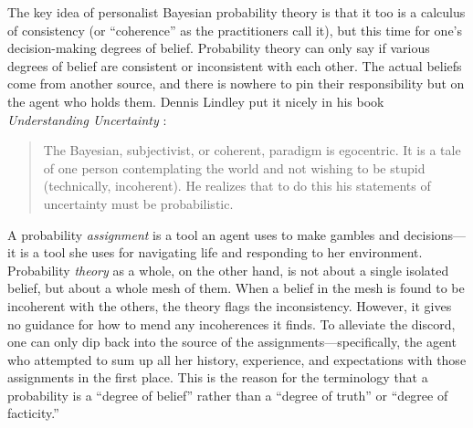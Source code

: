 \documentclass[aps,pra,superscriptaddress,12pt,tightenlines,nofootinbib]{revtex4-2}
\begin{document}
The key idea of personalist Bayesian probability theory is that it too is a calculus of consistency (or ``coherence'' as the practitioners call it), but this time for one's decision-making degrees of belief.  Probability theory can only say if various degrees of belief are consistent or inconsistent with each other. The actual beliefs come from another source, and there is nowhere to pin their responsibility but on the agent who holds them.  Dennis Lindley put it nicely in his book {\sl Understanding Uncertainty\/} \cite{Lindley06}:
\begin{quote}
The Bayesian, subjectivist, or coherent, para\-digm is egocentric. It is a tale of one person contemplating the world and not wishing to be stupid (technically, incoherent). He realizes that to do this his statements of uncertainty must be probabilistic.
\end{quote}
A probability {\it assignment\/} is a tool an agent uses to make gambles and decisions---it is a tool she uses for navigating life and responding to her environment.  Probability {\it theory\/} as a whole, on the other hand, is not about a single isolated belief, but about a whole mesh of them.  When a belief in the mesh is found to be incoherent with the others, the theory flags the inconsistency.  However, it gives no guidance for how to mend any incoherences it finds.  To alleviate the discord, one can only dip back into the source of the assignments---specifically, the agent who attempted to sum up all her history, experience, and expectations with those assignments in the first place.  This is the reason for the terminology that a probability is a ``degree of belief'' rather than a ``degree of truth'' or ``degree of facticity.''
\end{document}
